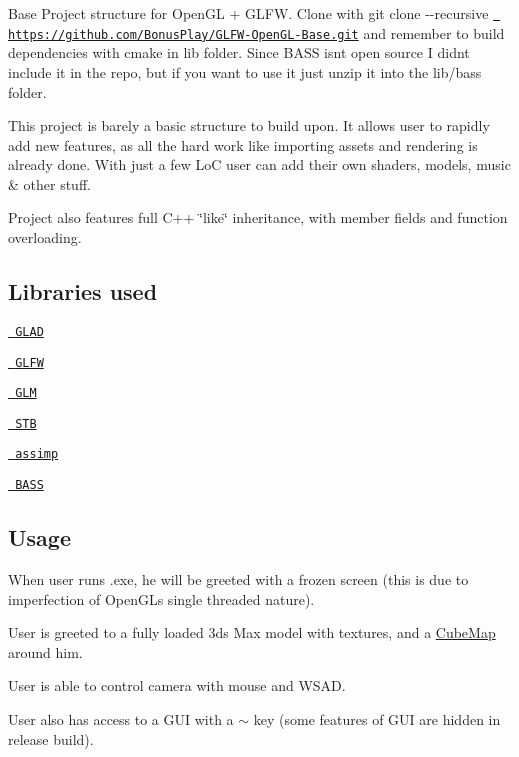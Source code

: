 Base Project structure for Open\+GL + G\+L\+FW. Clone with {\ttfamily git clone -\/-\/recursive \href{https://github.com/BonusPlay/GLFW-OpenGL-Base.git}{\texttt{ https\+://github.\+com/\+Bonus\+Play/\+G\+L\+F\+W-\/\+Open\+G\+L-\/\+Base.\+git}}} and remember to build dependencies with cmake in {\ttfamily lib} folder. Since B\+A\+SS isn\textquotesingle{}t open source I didn\textquotesingle{}t include it in the repo, but if you want to use it just unzip it into the {\ttfamily lib/bass} folder.

This project is barely a basic structure to build upon. It allows user to rapidly add new features, as all the hard work like importing assets and rendering is already done. With just a few LoC user can add their own shaders, models, music \& other stuff.

Project also features full C++ \char`\"{}like\char`\"{} inheritance, with member fields and function overloading.

\subsection*{Libraries used}


\begin{DoxyItemize}
\item \href{https://github.com/Dav1dde/glad}{\texttt{ G\+L\+AD}}
\item \href{https://github.com/glfw/glfw}{\texttt{ G\+L\+FW}}
\item \href{https://github.com/g-truc/glm}{\texttt{ G\+LM}}
\item \href{https://github.com/nothings/stb}{\texttt{ S\+TB}}
\item \href{https://github.com/assimp/assimp}{\texttt{ assimp}}
\item \href{https://www.un4seen.com/}{\texttt{ B\+A\+SS}}
\end{DoxyItemize}

\subsection*{Usage}

When user runs .exe, he will be greeted with a frozen screen (this is due to imperfection of Open\+GL\textquotesingle{}s single threaded nature).



User is greeted to a fully loaded 3ds Max model with textures, and a \mbox{\hyperlink{struct_cube_map}{Cube\+Map}} around him.



User is able to control camera with mouse and W\+S\+AD.



User also has access to a G\+UI with a $\sim$ key (some features of G\+UI are hidden in release build).

 
